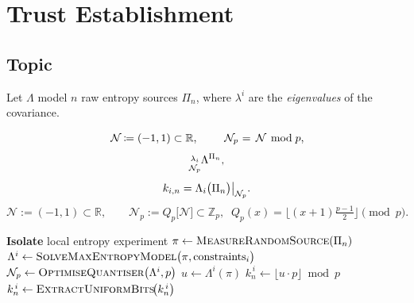 \chapter{Trust Establishment}

\label{chap:trust-establishment}

\begin{abstract}
In cooperative systems the parties make no assumptions about channel security; this stage is therefore called \emph{trust establishment}.  
Classical \emph{unauthenticated} key-exchange schemes provide confidentiality against passive eavesdroppers, yet they fall to active man-in-the-middle attacks.  
Cooperation cannot rely on unverified assumptions.  
Our sole assumption is access to a local true-random generator; parties remain vulnerable only to signal-loss. 

We propose that each participant first isolates and safeguards an experiment to measure a truly random source, then models the resulting noise according to their individual preferences.  
No harm arises if other parties learn one another’s secret keys, secrets are tactical disadvantages. 
\end{abstract}


\section{Topic}
Let $\Lambda$ model $n$ raw entropy sources $\Pi^{}_{n}$, where $\lambda^{i}$ are the \emph{eigenvalues} of the covariance.  

\begin{protocol}
\caption{Private-key derivation from a random signal.}
\label{prot:eczkmh}
\begin{center}
\[
 \mathop{}{\mathcal{N}}_{}  \coloneqq (-1,1) \subset \mathbb{R}, 
\qquad 
 \mathop{}{ \mathop{}{\mathcal{N}}_{p} }_{}  = \mathop{}{\mathcal{N}}_{}  \: \bmod{} p,
\]
\[
 \mathop{}^{\lambda_{i}}_{\mathcal{N}_{p}}\!{\Lambda}^{\Pi_{n}}_{} ,
\]
\[
 k_{i,n}=\Lambda_{i}\bigl(\Pi_{n}\bigr)\bigr|_{\mathcal N_p} .
\]
\[
\mathcal N := (-1,1)\subset\mathbb R,
\qquad
\mathcal N_p := Q_p\!\bigl[\mathcal N\bigr]\subset\mathbb Z_p,
\;\;
Q_p(x)=\bigl\lfloor(x+1)\tfrac{p-1}{2}\bigr\rfloor \pmod{p}.
\]
\end{center}
\end{protocol}

\begin{algorithm}[H]
\caption{Entropy-Maximised Private-Key Derivation (\( \mathsf{Alt}\,1 \))}
\label{alg:emp-max}

\textbf{Isolate} local entropy experiment
\nl $\pi \gets \textsc{MeasureRandomSource}(\Pi_n)$\;
\nl $\Lambda^{i} \gets \textsc{SolveMaxEntropyModel}\bigl(\pi,\mathrm{constraints}_i\bigr)$\;
\nl $\mathcal{N}_p \gets \textsc{OptimiseQuantiser}\bigl(\Lambda^{i},p\bigr)$\;
\nl $u \gets \Lambda^{i}(\pi)$
\nl $k_n^{\,i} \gets \bigl\lfloor u\cdot p \bigr\rfloor \bmod p$\;
\nl $k_n^{\,i} \gets \textsc{ExtractUniformBits}\!\bigl(k_n^{\,i}\bigr)$
\end{algorithm}


